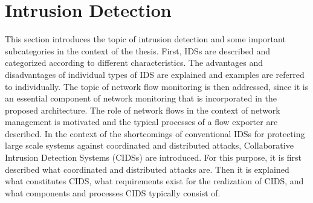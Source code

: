 \section{Intrusion Detection}

This section introduces the topic of intrusion detection and some important subcategories in the context of the thesis. First, IDSs are described and categorized according to different characteristics. The advantages and disadvantages of individual types of IDS are explained and examples are referred to individually. The topic of network flow monitoring is then addressed, since it is an essential component of network monitoring that is incorporated in the proposed architecture. The role of network flows in the context of network management is motivated and the typical processes of a flow exporter are described. In the context of the shortcomings of conventional IDSs for protecting large scale systems against coordinated and distributed attacks, Collaborative Intrusion Detection Systems (CIDSs) are introduced. For this purpose, it is first described what coordinated and distributed attacks are.  Then it is explained what constitutes CIDS, what requirements exist for the realization of CIDS, and what components and processes CIDS typically consist of.





